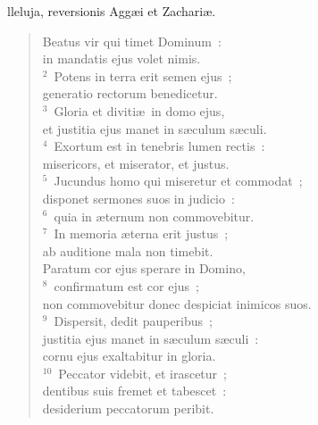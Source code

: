 \bchapter[Psalm]
lleluja, reversionis Agg\ae i et Zachari\ae . \begin{verse}Beatus vir qui timet Dominum~:\\ in mandatis ejus volet nimis.\\
${}^{2}$~Potens in terra erit semen ejus~;\\ generatio rectorum benedicetur.\\
${}^{3}$~Gloria et diviti\ae\ in domo ejus,\\ et justitia ejus manet in s\ae culum s\ae culi.\\
${}^{4}$~Exortum est in tenebris lumen rectis~:\\ misericors, et miserator, et justus.\\
${}^{5}$~Jucundus homo qui miseretur et commodat~;\\ disponet sermones suos in judicio~:\\
${}^{6}$~quia in \ae ternum non commovebitur.\\
${}^{7}$~In memoria \ae terna erit justus~;\\ ab auditione mala non timebit.\\ Paratum cor ejus sperare in Domino,\\
${}^{8}$~confirmatum est cor ejus~;\\ non commovebitur donec despiciat inimicos suos.\\
${}^{9}$~Dispersit, dedit pauperibus~;\\ justitia ejus manet in s\ae culum s\ae culi~:\\ cornu ejus exaltabitur in gloria.\\
${}^{10}$~Peccator videbit, et irascetur~;\\ dentibus suis fremet et tabescet~:\\ desiderium peccatorum peribit.\end{verse}



